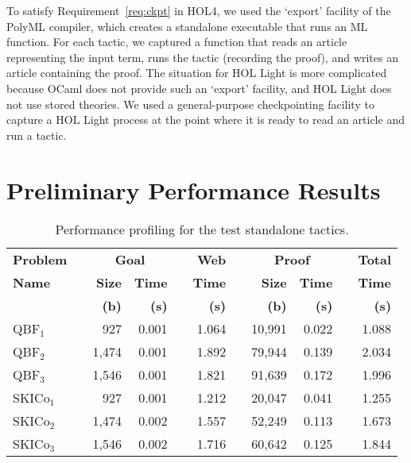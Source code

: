 \documentclass{llncs}
\begin{document}
To satisfy Requirement~\ref{req:ckpt} in HOL4, we used the `export' facility of the PolyML compiler, which creates a standalone executable that runs an ML function.
For each tactic, we captured a function that reads an article representing the input term, runs the tactic (recording the proof), and writes an article containing the proof.
The situation for HOL Light is more complicated because OCaml does not provide such an `export' facility, and HOL Light does not use stored theories.
We used a general-purpose checkpointing facility to capture a HOL Light process at the point where it is ready to read an article and run a tactic.


\section{Preliminary Performance Results}
\label{sec:performance}

\begin{table}
\begin{center}
\begin{tabular}{||@{~}l@{~}||@{}l@{~}r@{~}|@{~}r@{~}l@{}||@{~}r@{~}||@{}l@{~}r@{~}|@{~}r@{~}l@{}||@{~}r@{~}||}
\hline
\textbf{Problem} & & \multicolumn{2}{c}{\textbf{Goal}} & & \textbf{Web} & & \multicolumn{2}{c}{\textbf{Proof}} & & \textbf{Total} \\
\cline{2-4} \cline{7-9}
\textbf{Name} & & \textbf{Size} & \textbf{Time} & & \textbf{Time} & & \textbf{Size} & \textbf{Time} & & \textbf{Time} \\
 & & \textbf{(b)} & \textbf{(s)} & & \textbf{(s)} & & \textbf{(b)} & \textbf{(s)} & & \textbf{(s)} \\
\hline
QBF${}_1$ & & 927 & 0.001 & & 1.064 & & 10,991 & 0.022 & & 1.088 \\
QBF${}_2$ & & 1,474 & 0.001 & & 1.892 & & 79,944 & 0.139 & & 2.034 \\
QBF${}_3$ & & 1,546 & 0.001 & & 1.821 & & 91,639 & 0.172 & & 1.996 \\
SKICo${}_1$ & & 927 & 0.001 & & 1.212 & & 20,047 & 0.041 & & 1.255 \\
SKICo${}_2$ & & 1,474 & 0.002 & & 1.557 & & 52,249 & 0.113 & & 1.673 \\
SKICo${}_3$ & & 1,546 & 0.002 & & 1.716 & & 60,642 & 0.125 & & 1.844 \\
\hline
\end{tabular}
\end{center}
\caption{Performance profiling for the test standalone tactics.}
\label{tab:performance}
\end{table}
\end{document}
